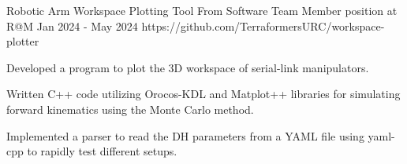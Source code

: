 \begin{project}
  {Robotic Arm Workspace Plotting Tool}
  {From Software Team Member position at R@M}
  {Jan 2024 - May 2024}
  {https://github.com/TerraformersURC/workspace-plotter}

  \item Developed a program to plot the 3D workspace of serial-link manipulators.

  \item Written C++ code utilizing Orocos-KDL and Matplot++ libraries for simulating forward
        kinematics using the Monte Carlo method.

  \item Implemented a parser to read the DH parameters from a YAML file using yaml-cpp to rapidly
        test different setups.

\end{project}
